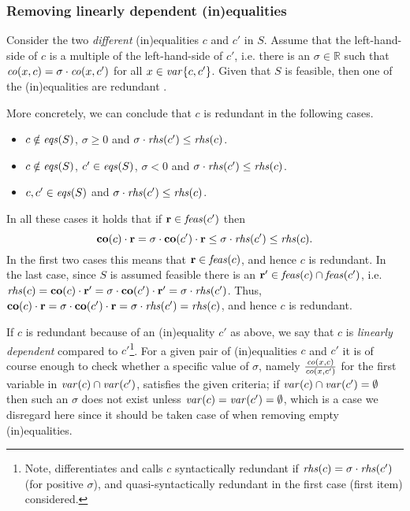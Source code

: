 \subsubsection{Removing linearly dependent (in)equalities}
Consider the two \emph{different} (in)equalities $c$ and $c'$ in $S$. 
Assume that the left-hand-side of $c$ is a multiple of the left-hand-side of $c'$, i.e. there is an $\sigma\in \mathbb{R}$ such that $\mathit{co}(x,c) = \sigma\cdot\mathit{co}(x,c')$ for all $x\in\mathit{var}\{c,c'\}$. Given that $S$ is feasible, then one of the (in)equalities are redundant \cite{lassez93}. %
 
More concretely, we can conclude that $c$ is redundant in the following cases.

\begin{itemize}
\item $c\notin \mathit{eqs}(S)$, $\sigma\geq 0$ and $\sigma\cdot \mathit{rhs}(c')\leq \mathit{rhs}(c)$. 
\item $c\notin \mathit{eqs}(S)$, $c'\in \mathit{eqs}(S)$, $\sigma<0$ and  $\sigma\cdot \mathit{rhs}(c')\leq \mathit{rhs}(c)$. 
\item $c,c'\in \mathit{eqs}(S)$ and $\sigma\cdot \mathit{rhs}(c')\leq \mathit{rhs}(c)$. 
\end{itemize}
In all these cases it holds that if $\mathbf{r}\in\mathit{feas}(c')$ then 
\begin{equation}\label{eq:3cases}
\mathbf{co}(c)\cdot \mathbf{r} = \sigma\cdot \mathbf{co}(c')\cdot \mathbf{r} \leq \sigma \cdot \mathit{rhs}(c')\leq  \mathit{rhs}(c).
\end{equation}
In the first two cases this means that $\mathbf{r}\in\mathit{feas}(c)$, and hence $c$ is redundant. In the last case, since $S$ is assumed feasible there is an $\mathbf{r}'\in\mathit{feas}(c)\cap\mathit{feas}(c')$, i.e. $\mathit{rhs}(c)=\mathbf{co}(c)\cdot\mathbf{r}'=\sigma\cdot\mathbf{co}(c')\cdot \mathbf{r}' = \sigma\cdot \mathit{rhs}(c')$. Thus, $\mathbf{co}(c)\cdot\mathbf{r}=\sigma\cdot\mathbf{co}(c')\cdot\mathbf{r}=\sigma\cdot\mathit{rhs}(c')=\mathit{rhs}(c)$, and hence $c$ is redundant. 

If $c$ is redundant because of an (in)equality $c'$ as above, we say that $c$ is \emph{linearly dependent} compared to $c'$\footnote{Note, \cite{lassez93} differentiates and  calls $c$ syntactically redundant if $\mathit{rhs}(c)=\sigma\cdot\mathit{rhs}(c')$ (for positive $\sigma$), and quasi-syntactically redundant in the first case (first item) considered.}.
For a given pair of (in)equalities $c$ and $c'$ it is of course enough to check whether a specific value of $\sigma$, namely $\frac{\mathit{co}(x,c)}{\mathit{co}(x,c')}$ for the first variable in $\mathit{var}(c)\cap\mathit{var}(c')$, satisfies the given criteria; if $\mathit{var}(c)\cap\mathit{var}(c') = \emptyset$ then such an $\sigma$ does not exist unless $\mathit{var}(c)=\mathit{var}(c')=\emptyset$, which is a case we disregard here since it should be taken case of when removing empty (in)equalities.
%

